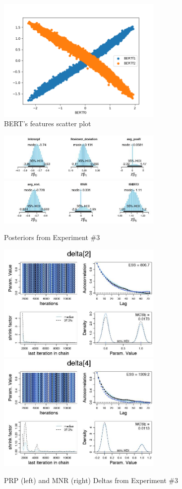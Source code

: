\documentclass[man, floatsintext, 10pt]{apa6}
\begin{document}
\begin{figure}
\includegraphics[width=8cm]{BERTFeaturesScatterPlot.png}
\caption{BERT's features scatter plot}
  \label{BERTf}
\end{figure}

\begin{figure}
\includegraphics[width=8cm]{posteriors_bdata_02.jpg}
\includegraphics[width=8cm]{pposteriors_bdata_02.jpg}
\caption{Posteriors from Experiment \#3}
  \label{PRP_MNR_Posteriors}
\end{figure}

\begin{figure}
\includegraphics[width=8cm]{delta_PR_bdata_02.jpg}
\includegraphics[width=8cm]{delta_MNR_bdata_02.jpg}
\caption{PRP (left) and MNR (right) Deltas from Experiment \#3}
  \label{PRP_MNR_Deltas}
\end{figure}
\end{document}
